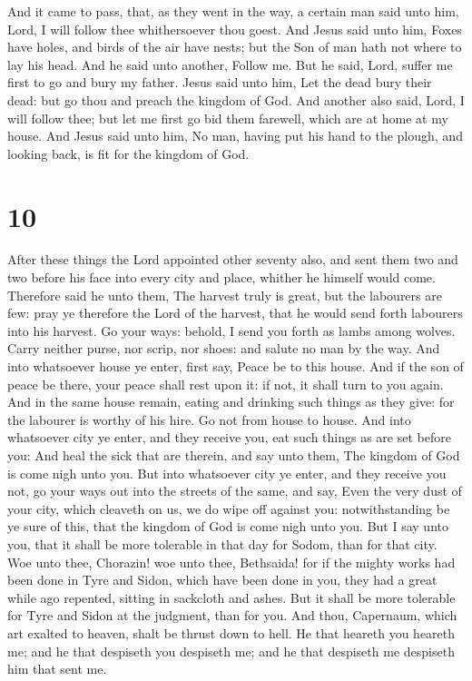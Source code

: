  And it came to pass, that, as they went in the way, a
certain man said unto him, Lord, I will follow thee whithersoever thou
goest.  And Jesus said unto him, Foxes have holes, and
birds of the air have nests; but the Son of man hath not where to lay
his head.  And he said unto another, Follow me. But he
said, Lord, suffer me first to go and bury my father. 
Jesus said unto him, Let the dead bury their dead: but go thou and
preach the kingdom of God.  And another also said, Lord, I
will follow thee; but let me first go bid them farewell, which are at
home at my house.  And Jesus said unto him, No man, having
put his hand to the plough, and looking back, is fit for the kingdom of
God.

\hypertarget{section-9}{%
\section{10}\label{section-9}}

 After these things the Lord appointed other seventy also,
and sent them two and two before his face into every city and place,
whither he himself would come.  Therefore said he unto them,
The harvest truly is great, but the labourers are few: pray ye therefore
the Lord of the harvest, that he would send forth labourers into his
harvest.  Go your ways: behold, I send you forth as lambs
among wolves.  Carry neither purse, nor scrip, nor shoes:
and salute no man by the way.  And into whatsoever house ye
enter, first say, Peace be to this house.  And if the son of
peace be there, your peace shall rest upon it: if not, it shall turn to
you again.  And in the same house remain, eating and
drinking such things as they give: for the labourer is worthy of his
hire. Go not from house to house.  And into whatsoever city
ye enter, and they receive you, eat such things as are set before you:
 And heal the sick that are therein, and say unto them, The
kingdom of God is come nigh unto you.  But into whatsoever
city ye enter, and they receive you not, go your ways out into the
streets of the same, and say,  Even the very dust of your
city, which cleaveth on us, we do wipe off against you: notwithstanding
be ye sure of this, that the kingdom of God is come nigh unto you.
 But I say unto you, that it shall be more tolerable in
that day for Sodom, than for that city.  Woe unto thee,
Chorazin! woe unto thee, Bethsaida! for if the mighty works had been
done in Tyre and Sidon, which have been done in you, they had a great
while ago repented, sitting in sackcloth and ashes.  But it
shall be more tolerable for Tyre and Sidon at the judgment, than for
you.  And thou, Capernaum, which art exalted to heaven,
shalt be thrust down to hell.  He that heareth you heareth
me; and he that despiseth you despiseth me; and he that despiseth me
despiseth him that sent me.

